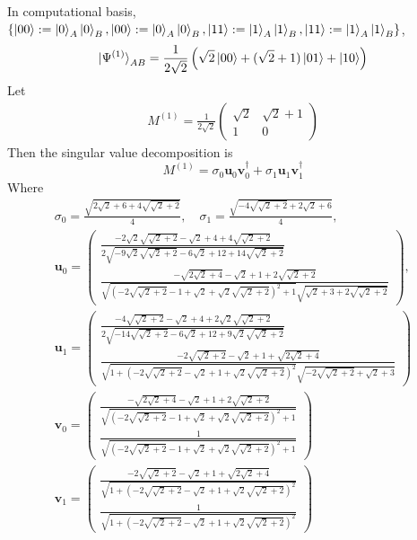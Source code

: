 \documentclass[a4paper,11pt]{article}
\begin{document}
In computational basis, $\{\ket{00}:=\ket{0}_A\ket{0}_B, \ket{00}:=\ket{0}_A\ket{0}_B, \ket{11}:=\ket{1}_A\ket{1}_B, \ket{11}:=\ket{1}_A\ket{1}_B\}$,
\begin{equation}
    \ket{\Psi^{(1)}}_{AB}
    =\frac{1}{2\sqrt2}\left(\sqrt{2}\ket{00}+(\sqrt{2}+1)\ket{01}+\ket{10}\right)
\end{equation}
Let
\begin{align}
    M^{(1)}=\frac{1}{2\sqrt2}\begin{pmatrix}
        \sqrt{2} & \sqrt{2} + 1 \\
        1 & 0
    \end{pmatrix}
\end{align}
Then the singular value decomposition is
\begin{equation}
    M^{(1)}=\sigma_0\mathbf u_0\mathbf v_0^\dagger+\sigma_1\mathbf u_1\mathbf v_1^\dagger
\end{equation}
Where
\begin{gather}
    \sigma_0=\frac{\sqrt{2 \sqrt{2} + 6 + 4 \sqrt{\sqrt{2} + 2}}}{4}, \quad \sigma_1=\frac{\sqrt{- 4 \sqrt{\sqrt{2} + 2} + 2 \sqrt{2} + 6}}{4}, \\
    \mathbf u_0=\begin{pmatrix}\frac{- 2 \sqrt{2} \sqrt{\sqrt{2} + 2} - \sqrt{2} + 4 + 4 \sqrt{\sqrt{2} + 2}}{2 \sqrt{- 9 \sqrt{2} \sqrt{\sqrt{2} + 2} - 6 \sqrt{2} + 12 + 14 \sqrt{\sqrt{2} + 2}}}\\\frac{- \sqrt{2 \sqrt{2} + 4} - \sqrt{2} + 1 + 2 \sqrt{\sqrt{2} + 2}}{\sqrt{\left(- 2 \sqrt{\sqrt{2} + 2} - 1 + \sqrt{2} + \sqrt{2} \sqrt{\sqrt{2} + 2}\right)^{2} + 1} \sqrt{\sqrt{2} + 3 + 2 \sqrt{\sqrt{2} + 2}}}\end{pmatrix},\\
    \mathbf u_1=\begin{pmatrix}\frac{- 4 \sqrt{\sqrt{2} + 2} - \sqrt{2} + 4 + 2 \sqrt{2} \sqrt{\sqrt{2} + 2}}{2 \sqrt{- 14 \sqrt{\sqrt{2} + 2} - 6 \sqrt{2} + 12 + 9 \sqrt{2} \sqrt{\sqrt{2} + 2}}}\\\frac{- 2 \sqrt{\sqrt{2} + 2} - \sqrt{2} + 1 + \sqrt{2 \sqrt{2} + 4}}{\sqrt{1 + \left(- 2 \sqrt{\sqrt{2} + 2} - \sqrt{2} + 1 + \sqrt{2} \sqrt{\sqrt{2} + 2}\right)^{2}} \sqrt{- 2 \sqrt{\sqrt{2} + 2} + \sqrt{2} + 3}}\end{pmatrix}\\
    \mathbf v_0 = \begin{pmatrix}\frac{- \sqrt{2 \sqrt{2} + 4} - \sqrt{2} + 1 + 2 \sqrt{\sqrt{2} + 2}}{\sqrt{\left(- 2 \sqrt{\sqrt{2} + 2} - 1 + \sqrt{2} + \sqrt{2} \sqrt{\sqrt{2} + 2}\right)^{2} + 1}}\\\frac{1}{\sqrt{\left(- 2 \sqrt{\sqrt{2} + 2} - 1 + \sqrt{2} + \sqrt{2} \sqrt{\sqrt{2} + 2}\right)^{2} + 1}}\end{pmatrix}\\
    \mathbf v_1 = \begin{pmatrix}\frac{- 2 \sqrt{\sqrt{2} + 2} - \sqrt{2} + 1 + \sqrt{2 \sqrt{2} + 4}}{\sqrt{1 + \left(- 2 \sqrt{\sqrt{2} + 2} - \sqrt{2} + 1 + \sqrt{2} \sqrt{\sqrt{2} + 2}\right)^{2}}}\\\frac{1}{\sqrt{1 + \left(- 2 \sqrt{\sqrt{2} + 2} - \sqrt{2} + 1 + \sqrt{2} \sqrt{\sqrt{2} + 2}\right)^{2}}}\end{pmatrix}
\end{gather}
\end{document}
